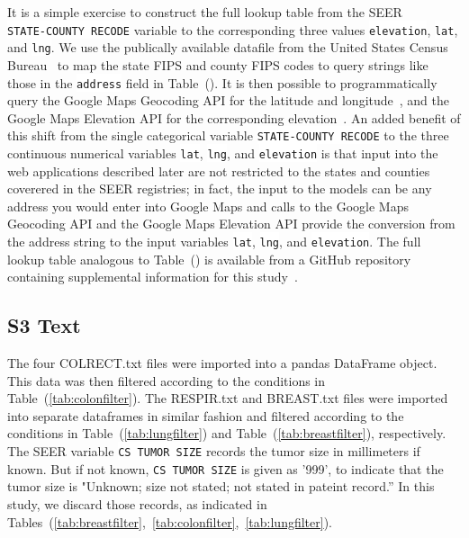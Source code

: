\documentclass[10pt,letterpaper]{article}
\newcommand{\codewhite}[1]{\colorbox{white}{\texttt{#1}}}
\begin{document}
It is a simple exercise to construct the full lookup table from the SEER \\  \codewhite{STATE-COUNTY RECODE} variable to the corresponding three values \codewhite{elevation}, \codewhite{lat}, and \codewhite{lng}. We use the publically available datafile from the United States Census Bureau~\cite{census} to map the state FIPS and county FIPS codes to query strings like those in the \codewhite{address} field in Table~(). 
It is then possible to programmatically query the Google Maps Geocoding API for the latitude and longitude~\cite{geocode}, and the Google Maps Elevation API for the corresponding elevation~\cite{elevation}.
An added benefit of this shift from the single categorical variable \codewhite{STATE-COUNTY RECODE} to the three continuous numerical variables \codewhite{lat}, \codewhite{lng}, and \codewhite{elevation} is that input into the web applications described later are not restricted to the states and counties coverered in the SEER registries; in fact, the input to the models can be any address you would enter into Google Maps and calls to the Google Maps Geocoding API and the Google Maps Elevation API provide the conversion from the address string to the input variables \codewhite{lat}, \codewhite{lng}, and \codewhite{elevation}. The full lookup table analogous to Table~() is available from a GitHub repository containing supplemental information for this study~\cite{supp}. 



\subsection*{S3 Text}
\label{S3_Text}

 The four COLRECT.txt files were imported into a pandas DataFrame object.
This data was then filtered according to the conditions in Table~(\ref{tab:colonfilter}).
The RESPIR.txt and BREAST.txt files were imported into separate dataframes in similar fashion and filtered according
to the conditions in Table~(\ref{tab:lungfilter}) and Table~(\ref{tab:breastfilter}), respectively.
The SEER variable \codewhite{CS TUMOR SIZE} records the tumor size in millimeters if known. But if not known, \codewhite{CS TUMOR SIZE} is given as '999', to indicate that the tumor size is "Unknown; size not stated; not stated in pateint record.'' In this study, we discard those records, as indicated in Tables~(\ref{tab:breastfilter},~\ref{tab:colonfilter},~\ref{tab:lungfilter}).
\end{document}
